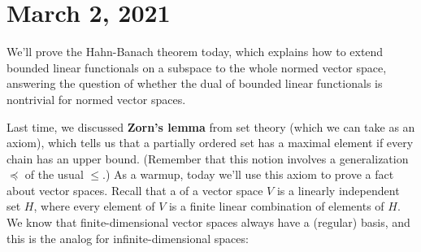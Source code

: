 
\pagebreak\section*{March 2, 2021}

We'll prove the Hahn-Banach theorem today, which explains how to extend bounded linear functionals on a subspace to the whole normed vector space, answering the question of whether the dual of bounded linear functionals is nontrivial for normed vector spaces. 

Last time, we discussed \textbf{Zorn's lemma} from set theory (which we can take as an axiom), which tells us that a partially ordered set has a maximal element if every chain has an upper bound. (Remember that this notion involves a generalization $\preceq$ of the usual $\le$.) As a warmup, today we'll use this axiom to prove a fact about vector spaces. Recall that a  of a vector space $V$ is a linearly independent set $H$, where every element of $V$ is a finite linear combination of elements of $H$. We know that finite-dimensional vector spaces always have a (regular) basis, and this is the analog for infinite-dimensional spaces:


